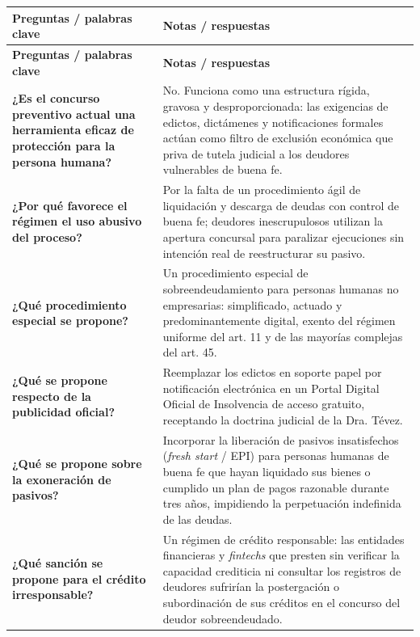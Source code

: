 \documentclass[12pt,oneside]{book}
\begin{document}
\begin{longtable}{
    >{\raggedright\arraybackslash}p{}
    >{\raggedright\arraybackslash}p{}
}
\toprule
\textbf{Preguntas / palabras clave} & \textbf{Notas / respuestas} \\
\midrule
\endfirsthead
\toprule
\textbf{Preguntas / palabras clave} & \textbf{Notas / respuestas} \\
\midrule
\endhead
\bottomrule
\endfoot

\textbf{¿Es el concurso preventivo actual una herramienta eficaz de protección para la persona humana?} &
No. Funciona como una estructura rígida, gravosa y desproporcionada: las exigencias de edictos, dictámenes y notificaciones formales actúan como filtro de exclusión económica que priva de tutela judicial a los deudores vulnerables de buena fe. \\[0.6em]

\textbf{¿Por qué favorece el régimen el uso abusivo del proceso?} &
Por la falta de un procedimiento ágil de liquidación y descarga de deudas con control de buena fe; deudores inescrupulosos utilizan la apertura concursal para paralizar ejecuciones sin intención real de reestructurar su pasivo. \\[0.6em]

\textbf{¿Qué procedimiento especial se propone?} &
Un procedimiento especial de sobreendeudamiento para personas humanas no empresarias: simplificado, actuado y predominantemente digital, exento del régimen uniforme del art. 11 y de las mayorías complejas del art. 45. \\[0.6em]

\textbf{¿Qué se propone respecto de la publicidad oficial?} &
Reemplazar los edictos en soporte papel por notificación electrónica en un Portal Digital Oficial de Insolvencia de acceso gratuito, receptando la doctrina judicial de la Dra. Tévez. \\[0.6em]

\textbf{¿Qué se propone sobre la exoneración de pasivos?} &
Incorporar la liberación de pasivos insatisfechos (\textit{fresh start} / EPI) para personas humanas de buena fe que hayan liquidado sus bienes o cumplido un plan de pagos razonable durante tres años, impidiendo la perpetuación indefinida de las deudas. \\[0.6em]

\textbf{¿Qué sanción se propone para el crédito irresponsable?} &
Un régimen de crédito responsable: las entidades financieras y \textit{fintechs} que presten sin verificar la capacidad crediticia ni consultar los registros de deudores sufrirían la postergación o subordinación de sus créditos en el concurso del deudor sobreendeudado. \\
\midrule


\end{longtable}
\end{document}
